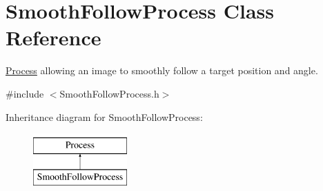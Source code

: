 \hypertarget{classSmoothFollowProcess}{\section{Smooth\-Follow\-Process Class Reference}
\label{classSmoothFollowProcess}
}


\hyperlink{classProcess}{Process} allowing an image to smoothly follow a target position and angle.  




{\ttfamily \#include $<$Smooth\-Follow\-Process.\-h$>$}

Inheritance diagram for Smooth\-Follow\-Process\-:\begin{figure}[H]
\begin{center}
\leavevmode
\includegraphics[height=2.000000cm]{classSmoothFollowProcess}
\end{center}
\end{figure}
